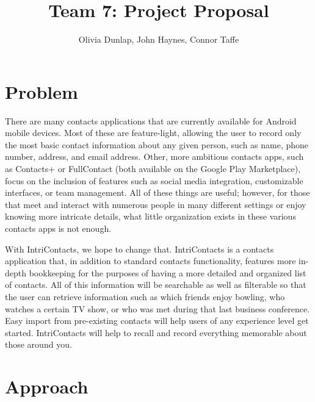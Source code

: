 \documentclass[man, 11pt, a4paper, biblatex]{apa6}
\title{Team 7: Project Proposal}
\author{Olivia Dunlap, John Haynes, Connor Taffe}
\affiliation{University of Arkansas at Little Rock}
\begin{document}
  \maketitle

  \section{Problem}

  There are many contacts applications that are currently available for Android mobile devices. Most of these are feature-light, allowing the user to record only the most basic contact information about any given person, such as name, phone number, address, and email address. Other, more ambitious contacts apps, such as Contacts+ or FullContact (both available on the Google Play Marketplace), focus on the inclusion of features such as social media integration, customizable interfaces, or team management. All of these things are useful; however, for those that meet and interact with numerous people in many different settings or enjoy knowing more intricate details, what little organization exists in these various contacts apps is not enough.

	With IntriContacts, we hope to change that. IntriContacts is a contacts application that, in addition to standard contacts functionality, features more in-depth bookkeeping for the purposes of having a more detailed and organized list of contacts. All of this information will be searchable as well as filterable so that the user can retrieve information such as which friends enjoy bowling, who watches a certain TV show, or who was met during that last business conference. Easy import from pre-existing contacts will help users of any experience level get started. IntriContacts will help to recall and record everything memorable about those around you.

  \section{Approach}
\end{document}
